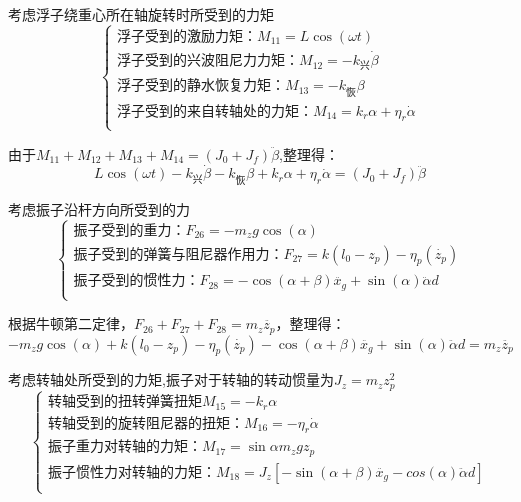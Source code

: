 \documentclass{article}
\numberwithin{equation}{subsection}
\begin{document}
考虑浮子绕重心所在轴旋转时所受到的力矩
\begin{equation}
    \left\{\begin{array}{l}
        \text{浮子受到的激励力矩：}M_{11}=L\cos(\omega t)\\
        \text{浮子受到的兴波阻尼力力矩：}M_{12}=-k_{兴}\dot{\beta}\\
        \text{浮子受到的静水恢复力矩：}M_{13}=-k_{恢}\beta\\
        \text{浮子受到的来自转轴处的力矩：}M_{14}=k_r\alpha+\eta_r\dot{\alpha}\\
    \end{array}\right.
    \end{equation}

由于$M_{11}+M_{12}+M_{13}+M_{14}=(J_0+J_f)\ddot{\beta}$,整理得：
\begin{equation}
    L\cos(\omega t)-k_{兴}\dot{\beta}-k_{恢}\beta+k_r\alpha+\eta_r\dot{\alpha}=(J_0+J_f)\ddot{\beta}
\end{equation}

考虑振子沿杆方向所受到的力
\begin{equation}
\left\{\begin{array}{l}
    \text{振子受到的重力：}F_{26}=-m_{z} g\cos(\alpha)\\
    \text{振子受到的弹簧与阻尼器作用力：}F_{27}=k\left(l_{0}-z_p\right)-\eta_{p}(\dot{z_p})\\
    \text{振子受到的惯性力：}F_{28}=-\cos(\alpha+\beta)\ddot{x_g}+\sin(\alpha)\ddot{\alpha}d\\
\end{array}\right.
\end{equation}

根据牛顿第二定律，$F_{26}+F_{27}+F_{28}=m_{z} \ddot{z_p}$，整理得：
\begin{equation}
    -m_{z} g\cos(\alpha)+k\left(l_{0}-z_p\right)-\eta_{p}(\dot{z_p})-\cos(\alpha+\beta)\ddot{x_g}+\sin(\alpha)\ddot{\alpha}d=m_{z} \ddot{z_p}
\end{equation}

考虑转轴处所受到的力矩,振子对于转轴的转动惯量为$J_z=m_zz_p^2$
\begin{equation}
    \left\{\begin{array}{l}
        \text{转轴受到的扭转弹簧扭矩}M_{15}=-k_r\alpha\\
        \text{转轴受到的旋转阻尼器的扭矩：}M_{16}=-\eta_r\dot{\alpha}\\
        \text{振子重力对转轴的力矩：}M_{17}=\sin{\alpha}m_zgz_p\\
        \text{振子惯性力对转轴的力矩：}M_{18}=J_z[-\sin(\alpha+\beta)\ddot{x_g}-cos(\alpha)\ddot{\alpha}d]\\
    \end{array}\right.
\end{equation}
\end{document}
